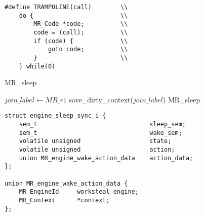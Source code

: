 \begin{algorithm}

\begin{minipage}{\textwidth}
\begin{multicols}{2}
\begin{verbatim}
#define TRAMPOLINE(call)        \\
    do {                        \\
        MR_Code *code;          \\
        code = (call);          \\
        if (code) {             \\
            goto code;          \\
        }                       \\
    } while(0)
\end{verbatim}

\begin{algorithmic}
        \State {}
        \State {}
        \State {}
        \Goto MR\_sleep
    \EndProcedure
\end{algorithmic}

\begin{algorithmic}
        \State $join\_label \gets MR\_r1$
        \State {}
        \State {}
        \State save\_dirty\_context($join\_label$)
        \State {}
        \Goto MR\_sleep
    \EndProcedure
\end{algorithmic}

\end{multicols}

\begin{verbatim}
struct engine_sleep_sync_i {
    sem_t                               sleep_sem;
    sem_t                               wake_sem;
    volatile unsigned                   state;
    volatile unsigned                   action;
    union MR_engine_wake_action_data    action_data;
};

union MR_engine_wake_action_data {      
    MR_EngineId     worksteal_engine;
    MR_Context      *context;
};
\end{verbatim}


\end{minipage}
\end{algorithm}
